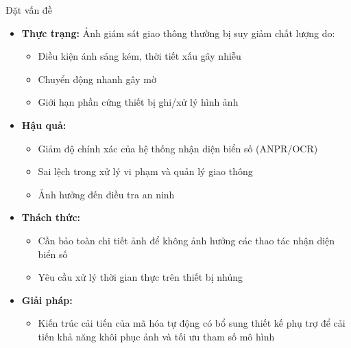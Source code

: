 
\begin{frame}{Đặt vấn đề}
    \begin{itemize}
        \item \textbf{Thực trạng:} Ảnh giám sát giao thông thường bị suy giảm chất lượng do:
        \begin{itemize}
            \item Điều kiện ánh sáng kém, thời tiết xấu gây nhiễu
            \item Chuyển động nhanh gây mờ 
            \item Giới hạn phần cứng thiết bị ghi/xử lý hình ảnh
        \end{itemize}
        \item \textbf{Hậu quả:}
        \begin{itemize}
            \item Giảm độ chính xác của hệ thống nhận diện biển số (ANPR/OCR)
            \item Sai lệch trong xử lý vi phạm và quản lý giao thông
            \item Ảnh hưởng đến điều tra an ninh
        \end{itemize}
        \item \textbf{Thách thức:}
        \begin{itemize}
            \item Cần bảo toàn chi tiết ảnh để không ảnh hưởng các thao tác nhận diện biển số
            \item Yêu cầu xử lý thời gian thực trên thiết bị nhúng
        \end{itemize}
        \item \textbf{Giải pháp:}
        \begin{itemize}
            \item Kiến trúc cải tiến của mã hóa tự động có bổ sung thiết kế phụ trợ để cải tiến khả năng khôi phục ảnh và tối ưu tham số mô hình 
        \end{itemize}
    \end{itemize}
\end{frame}

